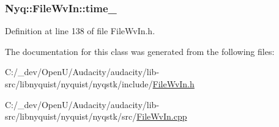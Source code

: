 \subsubsection[{\texorpdfstring{time\+\_\+}{time_}}]{ Nyq\+::\+File\+Wv\+In\+::time\+\_\+\hspace{0.3cm}{\ttfamily [protected]}}\hypertarget{class_nyq_1_1_file_wv_in_ad1cb7657e576ff43e45bbb91d2843962}{}\label{class_nyq_1_1_file_wv_in_ad1cb7657e576ff43e45bbb91d2843962}


Definition at line 138 of file File\+Wv\+In.\+h.



The documentation for this class was generated from the following files\+:\begin{DoxyCompactItemize}
\item 
C\+:/\+\_\+dev/\+Open\+U/\+Audacity/audacity/lib-\/src/libnyquist/nyquist/nyqstk/include/\hyperlink{_file_wv_in_8h}{File\+Wv\+In.\+h}\item 
C\+:/\+\_\+dev/\+Open\+U/\+Audacity/audacity/lib-\/src/libnyquist/nyquist/nyqstk/src/\hyperlink{_file_wv_in_8cpp}{File\+Wv\+In.\+cpp}\end{DoxyCompactItemize}
